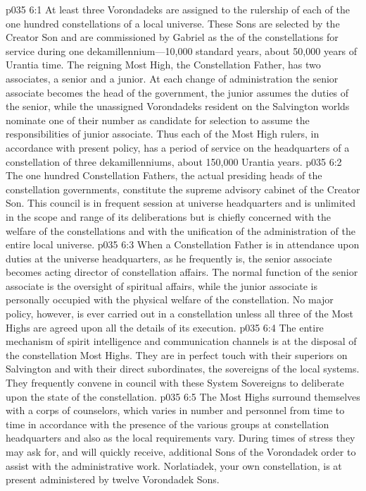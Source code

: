 \vs p035 6:1 At least three Vorondadeks are assigned to the rulership of each of the one hundred constellations of a local universe. These Sons are selected by the Creator Son and are commissioned by Gabriel as the  of the constellations for service during one dekamillennium---10,000 standard years, about 50,000 years of Urantia time. The reigning Most High, the Constellation Father, has two associates, a senior and a junior. At each change of administration the senior associate becomes the head of the government, the junior assumes the duties of the senior, while the unassigned Vorondadeks resident on the Salvington worlds nominate one of their number as candidate for selection to assume the responsibilities of junior associate. Thus each of the Most High rulers, in accordance with present policy, has a period of service on the headquarters of a constellation of three dekamillenniums, about 150,000 Urantia years.
\vs p035 6:2 The one hundred Constellation Fathers, the actual presiding heads of the constellation governments, constitute the supreme advisory cabinet of the Creator Son. This council is in frequent session at universe headquarters and is unlimited in the scope and range of its deliberations but is chiefly concerned with the welfare of the constellations and with the unification of the administration of the entire local universe.
\vs p035 6:3 When a Constellation Father is in attendance upon duties at the universe headquarters, as he frequently is, the senior associate becomes acting director of constellation affairs. The normal function of the senior associate is the oversight of spiritual affairs, while the junior associate is personally occupied with the physical welfare of the constellation. No major policy, however, is ever carried out in a constellation unless all three of the Most Highs are agreed upon all the details of its execution.
\vs p035 6:4 The entire mechanism of spirit intelligence and communication channels is at the disposal of the constellation Most Highs. They are in perfect touch with their superiors on Salvington and with their direct subordinates, the sovereigns of the local systems. They frequently convene in council with these System Sovereigns to deliberate upon the state of the constellation.
\vs p035 6:5 The Most Highs surround themselves with a corps of counselors, which varies in number and personnel from time to time in accordance with the presence of the various groups at constellation headquarters and also as the local requirements vary. During times of stress they may ask for, and will quickly receive, additional Sons of the Vorondadek order to assist with the administrative work. Norlatiadek, your own constellation, is at present administered by twelve Vorondadek Sons.\plusone
